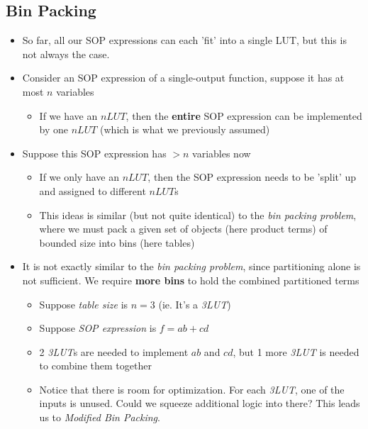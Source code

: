 \documentclass{article}
\begin{document}
\subsection{Bin Packing}
\begin{itemize}
    \item So far, all our SOP expressions can each 'fit' into a single LUT, but this is not always the case.
    \item Consider an SOP expression of a single-output function, suppose it has at most $n$ variables
        \begin{itemize}
            \item If we have an $nLUT$, then the \textbf{entire} SOP expression can be implemented by one $nLUT$ (which is what we previously assumed)
        \end{itemize}
    \item Suppose this SOP expression has $> n$ variables now
        \begin{itemize}
            \item If we only have an $nLUT$, then the SOP expression needs to be 'split' up and assigned to different $nLUT$s
            \item This ideas is similar (but not quite identical) to the \textit{bin packing problem}, where we must pack a given set of objects (here product terms) of bounded size into bins (here tables)
        \end{itemize}
    \item It is not exactly similar to the \textit{bin packing problem}, since partitioning alone is not sufficient. We require \textbf{more bins} to hold the combined partitioned terms
        \begin{itemize}
            \item Suppose \textit{table size} is $n = 3$ (ie. It's a \textit{3LUT})
            \item Suppose \textit{SOP expression} is $f = ab + cd$
            \item 2 \textit{3LUT}s are needed to implement $ab$ and $cd$, but 1 more \textit{3LUT} is needed to combine them together
            \item Notice that there is room for optimization. For each \textit{3LUT}, one of the inputs is unused. Could we squeeze additional logic into there? This leads us to \textit{Modified Bin Packing}.
        \end{itemize}
\end{itemize}
\end{document}
